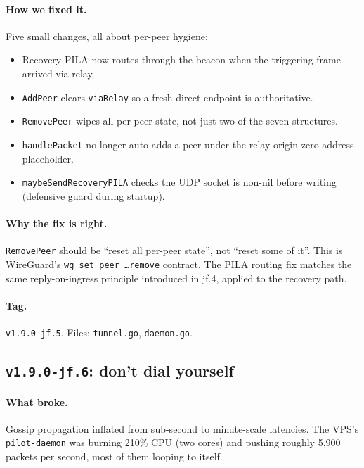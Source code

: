 \documentclass[11pt,a4paper]{article}
\begin{document}
\paragraph{How we fixed it.} Five small changes, all about
per-peer hygiene:
\begin{itemize}[leftmargin=1.2em]
    \item Recovery PILA now routes through the beacon when the
    triggering frame arrived via relay.
    \item \texttt{AddPeer} clears \texttt{viaRelay} so a fresh
    direct endpoint is authoritative.
    \item \texttt{RemovePeer} wipes all per-peer state, not
    just two of the seven structures.
    \item \texttt{handlePacket} no longer auto-adds a peer under
    the relay-origin zero-address placeholder.
    \item \texttt{maybeSendRecoveryPILA} checks the UDP socket
    is non-nil before writing (defensive guard during startup).
\end{itemize}

\paragraph{Why the fix is right.} \texttt{RemovePeer} should be
``reset all per-peer state'', not ``reset some of it''. This is
WireGuard's \texttt{wg set peer \ldots remove} contract. The
PILA routing fix matches the same reply-on-ingress principle
introduced in jf.4, applied to the recovery path.

\paragraph*{Tag.} \texttt{v1.9.0-jf.5}. Files: \texttt{tunnel.go},
\texttt{daemon.go}.

\subsection{\texttt{v1.9.0-jf.6}: don't dial yourself}

\paragraph{What broke.} Gossip propagation inflated from
sub-second to minute-scale latencies. The VPS's
\texttt{pilot-daemon} was burning 210\% CPU (two cores) and
pushing roughly 5,900 packets per second, most of them looping
to itself.
\end{document}
